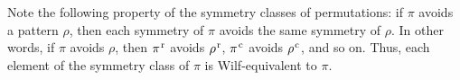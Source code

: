 \documentclass[
final
]{dmtcs-episciences}
\theoremstyle{definition}
\theoremstyle{remark}
\begin{document}
Note the following property of the symmetry classes of permutations: if $\pi$ avoids a pattern $\rho$, then each symmetry of $\pi$ avoids the same symmetry of $\rho$.  In other words, if $\pi$ avoids $\rho$, then $\pi^\text{\hspace{0.01in}r}$ avoids $\rho^\text{\hspace{0.01in}r}$,
$\pi^\text{\hspace{0.01in}c}$ avoids $\rho^\text{\hspace{0.01in}c}$, and so on.
Thus, each element of the symmetry class of $\pi$ is Wilf-equivalent to $\pi$.
\end{document}
